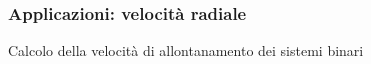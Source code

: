 \documentclass[10pt]{beamer}
\begin{document}
\begin{frame}
  \frametitle{Applicazioni: velocità radiale}
  \begin{adv}
  \item Calcolo della velocità di allontanamento dei sistemi binari
  \end{adv}
  \begin{figure}
    \centering
    \begin{tikzpicture}[scale=0.9]
      
    \end{tikzpicture}
  \end{figure}
\end{frame}
\end{document}
